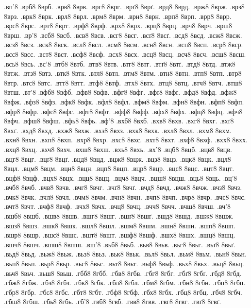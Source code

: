 {.вп'8
.врб8 8врб.
.врв8 8врв.
.врг8 8врг.
.врґ8 8врґ.
.врд8 8врд.
.врж8 8врж.
.врз8 8врз.
.врк8 8врк.
.врл8 8врл.
.врм8 8врм.
.врн8 8врн.
.врп8 8врп.
.врр8 8врр.
.врс8 8врс.
.врт8 8врт.
.врф8 8врф.
.врх8 8врх.
.врц8 8врц.
.врч8 8врч.
.врш8 8врш.
.вр'8
.всб8 8всб.
.всв8 8всв.
.всг8 8всг.
.всґ8 8всґ.
.всд8 8всд.
.всж8 8всж.
.всз8 8всз.
.вск8 8вск.
.всл8 8всл.
.всм8 8всм.
.всн8 8всн.
.всп8 8всп.
.вср8 8вср.
.всс8 8всс.
.вст8 8вст.
.всф8 8всф.
.всх8 8всх.
.всц8 8всц.
.всч8 8всч.
.всш8 8всш.
.всь8 8всь.
.вс'8
.втб8 8втб.
.втв8 8втв.
.втг8 8втг.
.втґ8 8втґ.
.втд8 8втд.
.втж8 8втж.
.втз8 8втз.
.втк8 8втк.
.втл8 8втл.
.втм8 8втм.
.втн8 8втн.
.втп8 8втп.
.втр8 8втр.
.втс8 8втс.
.втт8 8втт.
.втф8 8втф.
.втх8 8втх.
.втц8 8втц.
.втч8 8втч.
.втш8 8втш.
.вт'8
.вфб8 8вфб.
.вфв8 8вфв.
.вфг8 8вфг.
.вфґ8 8вфґ.
.вфд8 8вфд.
.вфж8 8вфж.
.вфз8 8вфз.
.вфк8 8вфк.
.вфл8 8вфл.
.вфм8 8вфм.
.вфн8 8вфн.
.вфп8 8вфп.
.вфр8 8вфр.
.вфс8 8вфс.
.вфт8 8вфт.
.вфф8 8вфф.
.вфх8 8вфх.
.вфц8 8вфц.
.вфч8 8вфч.
.вфш8 8вфш.
.вфь8 8вфь.
.вф'8
.вхб8 8вхб.
.вхв8 8вхв.
.вхг8 8вхг.
.вхґ8 8вхґ.
.вхд8 8вхд.
.вхж8 8вхж.
.вхз8 8вхз.
.вхк8 8вхк.
.вхл8 8вхл.
.вхм8 8вхм.
.вхн8 8вхн.
.вхп8 8вхп.
.вхр8 8вхр.
.вхс8 8вхс.
.вхт8 8вхт.
.вхф8 8вхф.
.вхх8 8вхх.
.вхц8 8вхц.
.вхч8 8вхч.
.вхш8 8вхш.
.вхь8 8вхь.
.вх'8
.вцб8 8вцб.
.вцв8 8вцв.
.вцг8 8вцг.
.вцґ8 8вцґ.
.вцд8 8вцд.
.вцж8 8вцж.
.вцз8 8вцз.
.вцк8 8вцк.
.вцл8 8вцл.
.вцм8 8вцм.
.вцн8 8вцн.
.вцп8 8вцп.
.вцр8 8вцр.
.вцс8 8вцс.
.вцт8 8вцт.
.вцф8 8вцф.
.вцх8 8вцх.
.вцц8 8вцц.
.вцч8 8вцч.
.вцш8 8вцш.
.вць8 8вць.
.вц'8
.вчб8 8вчб.
.вчв8 8вчв.
.вчг8 8вчг.
.вчґ8 8вчґ.
.вчд8 8вчд.
.вчж8 8вчж.
.вчз8 8вчз.
.вчк8 8вчк.
.вчл8 8вчл.
.вчм8 8вчм.
.вчн8 8вчн.
.вчп8 8вчп.
.вчр8 8вчр.
.вчс8 8вчс.
.вчт8 8вчт.
.вчф8 8вчф.
.вчх8 8вчх.
.вчц8 8вчц.
.вчч8 8вчч.
.вчш8 8вчш.
.вч'8
.вшб8 8вшб.
.вшв8 8вшв.
.вшг8 8вшг.
.вшґ8 8вшґ.
.вшд8 8вшд.
.вшж8 8вшж.
.вшз8 8вшз.
.вшк8 8вшк.
.вшл8 8вшл.
.вшм8 8вшм.
.вшн8 8вшн.
.вшп8 8вшп.
.вшр8 8вшр.
.вшс8 8вшс.
.вшт8 8вшт.
.вшф8 8вшф.
.вшх8 8вшх.
.вшц8 8вшц.
.вшч8 8вшч.
.вшш8 8вшш.
.вш'8
.вьб8 8вьб.
.вьв8 8вьв.
.вьг8 8вьг.
.вьґ8 8вьґ.
.вьд8 8вьд.
.вьж8 8вьж.
.вьз8 8вьз.
.вьк8 8вьк.
.вьл8 8вьл.
.вьм8 8вьм.
.вьн8 8вьн.
.вьп8 8вьп.
.вьр8 8вьр.
.вьс8 8вьс.
.вьт8 8вьт.
.вьф8 8вьф.
.вьх8 8вьх.
.вьц8 8вьц.
.вьч8 8вьч.
.вьш8 8вьш.
.гбб8 8гбб.
.гбв8 8гбв.
.гбг8 8гбг.
.гбґ8 8гбґ.
.гбд8 8гбд.
.гбж8 8гбж.
.гбз8 8гбз.
.гбк8 8гбк.
.гбл8 8гбл.
.гбм8 8гбм.
.гбн8 8гбн.
.гбп8 8гбп.
.гбр8 8гбр.
.гбс8 8гбс.
.гбт8 8гбт.
.гбф8 8гбф.
.гбх8 8гбх.
.гбц8 8гбц.
.гбч8 8гбч.
.гбш8 8гбш.
.гбь8 8гбь.
.гб'8
.гвб8 8гвб.
.гвв8 8гвв.
.гвг8 8гвг.
.гвґ8 8гвґ.
}
